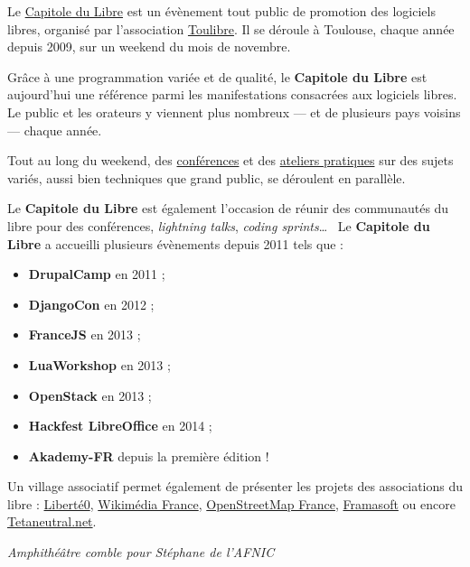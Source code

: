 
Le \href{http://capitoledulibre.org}{Capitole du Libre} est un
 évènement tout public de promotion des logiciels libres,
 organisé par l’association \href{http://toulibre.org/}{Toulibre}.
 Il se déroule à Toulouse, chaque année depuis 2009, sur un 
 weekend du mois de novembre.

Grâce à une programmation variée et de qualité, 
 le \textbf{Capitole du Libre} est aujourd’hui une référence
 parmi les manifestations consacrées aux logiciels libres. Le
 public et les orateurs y viennent plus nombreux — et
 de plusieurs pays voisins — chaque année.

Tout au long du weekend, des
 \href{https://2015.capitoledulibre.org/programme/conferences/}{conférences}
 et des \href{https://2015.capitoledulibre.org/programme/ateliers/}{ateliers pratiques}
 sur des sujets variés, aussi bien techniques que grand public, se déroulent en parallèle.

 
\Separateur

Le \textbf{Capitole du Libre} est également l'occasion de réunir des 
communautés du libre pour des conférences, \textit{lightning talks}, 
\textit{coding sprints}\dots ~ Le \textbf{Capitole du Libre} a 
accueilli plusieurs évènements depuis 2011 tels que :
\begin{itemize}[label=$\bullet$]
\item \textbf{DrupalCamp} en 2011 ;
\item \textbf{DjangoCon} en 2012 ;
\item \textbf{FranceJS} en 2013 ;
\item \textbf{LuaWorkshop} en 2013 ;
\item \textbf{OpenStack} en 2013 ;
\item \textbf{Hackfest LibreOffice}  en 2014 ;
\item \textbf{Akademy-FR} depuis la première édition !
\end{itemize}

\Separateur

Un village associatif permet également de présenter les projets des associations du libre : \href{http://liberte0.org/wiki/index.php?title=Accueil}{Liberté0},
 \href{http://wikimedia.fr/}{Wikimédia France},
 \href{https://openstreetmap.fr/}{OpenStreetMap France},
 \href{https://framasoft.org/}{Framasoft}
 ou encore \href{https://tetaneutral.net/}{Tetaneutral.net}.

\begin{center}
\textit{Amphithéâtre comble pour Stéphane  de l'AFNIC}
\end{center}

